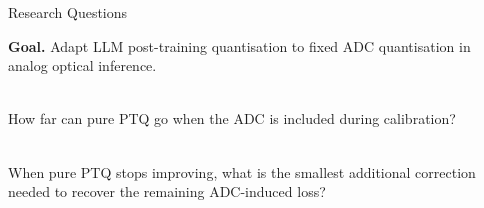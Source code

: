 \begin{frame}{Research Questions}

  \vfill
  {\normalsize\textbf{Goal.}}\;
  Adapt LLM post-training quantisation to fixed ADC quantisation
  in analog optical inference.

  \vspace{1.5em}
  \begin{description}
    \setlength\itemsep{1.2em}
    \item[\color{mybluedark}\textbf{RQ1 — ADC-aware PTQ}]\hfill\\
      How far can pure PTQ go when the ADC is included during calibration?

    \item[\color{mybluedark}\textbf{RQ2 — Beyond the PTQ plateau}]\hfill\\
      When pure PTQ stops improving, what is the smallest additional
      correction needed to recover the remaining ADC-induced loss?
  \end{description}
  \vfill

\end{frame}
